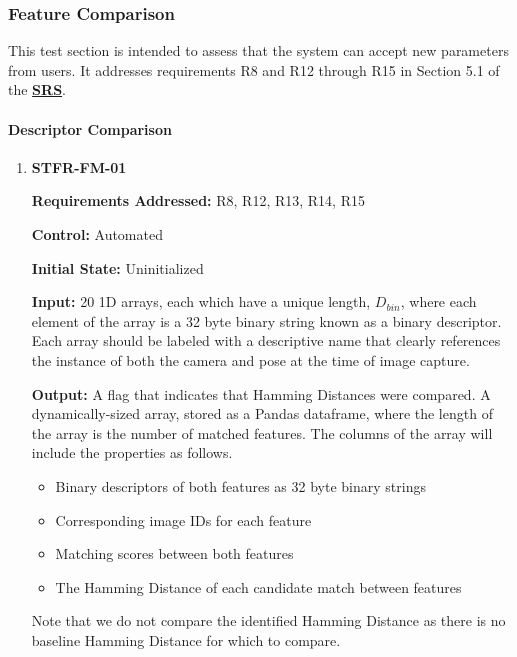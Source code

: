 \documentclass[12pt, titlepage]{article}
\begin{document}
\subsubsection{Feature Comparison}

This test section is intended to assess that the system can accept new parameters from users. It addresses 
requirements R8 and R12 through R15 in Section 5.1 of the 
\textbf{\href{https://github.com/KiranSingh15/CAS-741-Image-Correspondences/blob/main/docs/SRS/SRS.pdf}
{SRS}}. 
		
\paragraph{Descriptor Comparison}
\begin{enumerate}
\item \hypertarget{STFR-FM-01}{\textbf{STFR-FM-01}\\}
\textbf{Requirements Addressed:} R8, R12, R13, R14, R15

\textbf{Control:} Automated		

\textbf{Initial State:} Uninitialized

\textbf{Input:} 20 1D arrays, each which have a unique length, $D_{bin}$, where each element of the 
array is a 32 byte binary string known as a binary descriptor. Each array should be labeled with a 
descriptive name that clearly references the instance of both the camera and pose at the time of image 
capture.

\textbf{Output:} A flag that indicates that Hamming Distances were compared. A dynamically-sized array, stored as a Pandas dataframe, where the length of the array is the number of matched features. The columns of the array will include the properties as follows.
\begin{itemize}
\item Binary descriptors of both features as 32 byte binary strings
\item Corresponding image IDs for each feature
\item Matching scores between both features
\item The Hamming Distance of each candidate match between features
\end{itemize}
Note that we do not compare the identified Hamming Distance as there is no baseline Hamming Distance for which to compare. \\


\end{enumerate}
\end{document}
